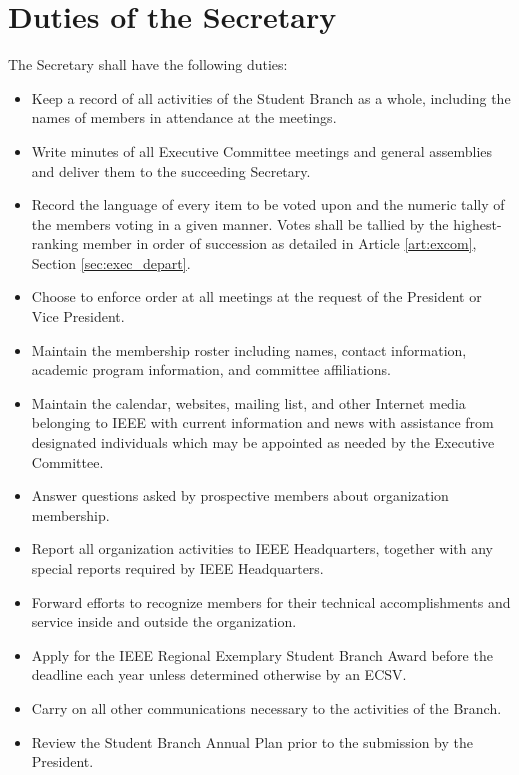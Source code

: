 \documentclass[12pt]{constitution}
\begin{document}
\section{Duties of the Secretary}
\label{sec:officer_sec}
The Secretary shall have the following duties:
\begin{itemize}
    \item Keep a record of all activities of the Student Branch as a whole, including the names of members in attendance at the meetings.
    \item Write minutes of all Executive Committee meetings and general assemblies and deliver them to the succeeding Secretary.
    \item Record the language of every item to be voted upon and the numeric tally of the members voting in a given manner. Votes shall be tallied by the highest-ranking member in order of succession as detailed in Article \ref{art:excom}, Section \ref{sec:exec_depart}. 
    \item Choose to enforce order at all meetings at the request of the President or Vice President.
    \item Maintain the membership roster including names, contact information, academic program information, and committee affiliations.
    \item Maintain the calendar, websites, mailing list, and other Internet media belonging to IEEE with current information and news with assistance from designated individuals which may be appointed as needed by the Executive Committee.
    \item Answer questions asked by prospective members about organization membership.
    \item Report all organization activities to IEEE Headquarters, together with any special reports required by IEEE Headquarters.
    \item Forward efforts to recognize members for their technical accomplishments and service inside and outside the organization.
    \item Apply for the IEEE Regional Exemplary Student Branch Award before the deadline each year unless determined otherwise by an ECSV.
    \item Carry on all other communications necessary to the activities of the Branch. 
    \item Review the Student Branch Annual Plan prior to the submission by the President.
\end{itemize}
\end{document}
